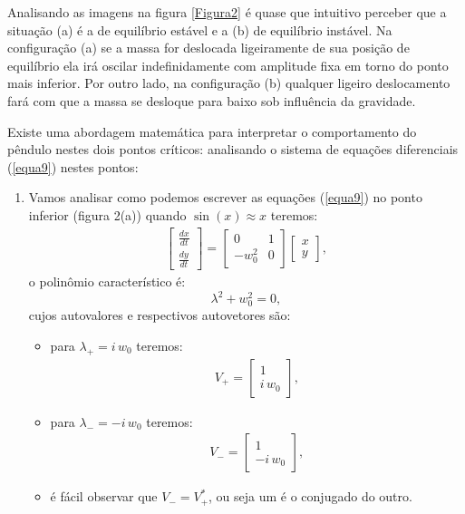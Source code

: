 \documentclass[12pt,openright,twoside,english,brazil]{abntex2}
\begin{document}
Analisando as imagens na figura \ref{Figura2} é quase que intuitivo perceber que a situação (a) é a de equilíbrio estável e a (b) de equilíbrio instável. Na configuração (a) se a massa for deslocada ligeiramente de sua posição de equilíbrio ela irá oscilar indefinidamente com amplitude fixa em torno do ponto mais inferior. Por outro lado, na configuração (b) qualquer ligeiro deslocamento fará com que a massa se desloque para baixo sob influência da gravidade.

Existe uma abordagem matemática para interpretar o comportamento do pêndulo nestes dois pontos críticos: analisando o sistema de equações diferenciais (\ref{equa9}) nestes pontos:
\begin{enumerate}[label=\alph*)]
 \item Vamos analisar como podemos escrever as equações (\ref{equa9}) no ponto inferior (figura 2(a)) quando $\sin{(x)} \approx x$ teremos:
\begin{eqnarray}
 \begin{bmatrix}
 \frac{dx}{dt} \\
 \frac{dy}{dt}
 \end{bmatrix}
 = \begin{bmatrix}
    0 & 1 \\
    -w_0^2 & 0
   \end{bmatrix}
   \begin{bmatrix}
    x \\
    y
   \end{bmatrix},
\end{eqnarray}
o polinômio característico é: 
\begin{equation}
 \lambda^2 + w_0^2=0, \nonumber
\end{equation}
cujos autovalores e respectivos autovetores são: 
\begin{itemize}
 \item para $\lambda_{+} = i\, w_0$ teremos:
      \begin{eqnarray}
       V_{+} = \begin{bmatrix}
                1 \\
                i\, w_0
               \end{bmatrix},
      \end{eqnarray}
 \item para $\lambda_{-} = -i\, w_0$ teremos:
      \begin{eqnarray}
       V_{-} = \begin{bmatrix}
                1 \\
                -i\, w_0
               \end{bmatrix},
      \end{eqnarray}
 \item é fácil observar que $V_{-} = V_{+}^{*}$, ou seja um é o conjugado do outro.        
\end{itemize}


\end{enumerate}
\end{document}
